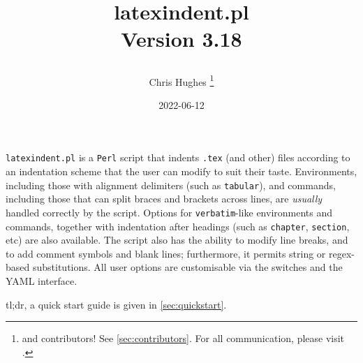 \title{%
	\begin{tcolorbox}[
			width=5.2cm,
			boxrule=0pt,
			colframe=white!40!black,
			colback=white,
			rightrule=2pt,
			sharp corners,
			enhanced,
			overlay={\node[anchor=north east,outer sep=2pt] at ([xshift=3cm,yshift=4mm]frame.north east) {\texttt{[image: logo]}}; }]
		\centering\ttfamily\bfseries latexindent.pl\\[1cm] Version 3.18
	\end{tcolorbox}
}
\author{Chris Hughes \thanks{and contributors!
		See \vref{sec:contributors}.
		For
		all communication, please visit \cite{latexindent-home}.}}
\date{2022-06-12}
\maketitle
\begin{adjustwidth}{1cm}{1cm}
	\small
	\texttt{latexindent.pl} is a \texttt{Perl} script that indents \texttt{.tex} (and other) files according to an indentation scheme that the user can modify to suit their taste.
	Environments, including those with alignment delimiters (such as \texttt{tabular}), and commands, including those that can split braces and brackets across lines, are \emph{usually} handled correctly by the script.
	Options for \texttt{verbatim}-like environments and commands, together with indentation after headings (such as \lstinline!chapter!, \lstinline!section!, etc) are also available.
	The script also has the ability to modify line breaks, and to add comment symbols and blank lines; furthermore, it permits string or
	regex-based substitutions.
	All user options are customisable via the switches and the YAML interface. 

    tl;dr, a quick start guide is given in \vref{sec:quickstart}.
\end{adjustwidth}
